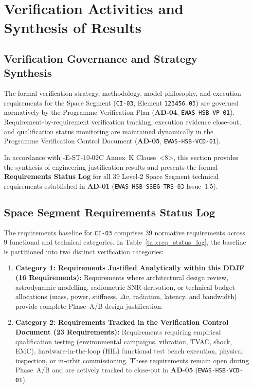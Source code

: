 \section{Verification Activities and Synthesis of Results}
\label{sec:verification}

\subsection{Verification Governance and Strategy Synthesis}
\label{sec:verification_governance}

The formal verification strategy, methodology, model philosophy, and execution requirements for the  Space Segment (\texttt{CI-03},  Element \texttt{123456.03}) are governed normatively by the Programme Verification Plan (\textbf{AD-04}, \texttt{EWAS-HSB-VP-01}). Requirement-by-requirement verification tracking, execution evidence close-out, and qualification status monitoring are maintained dynamically in the Programme Verification Control Document (\textbf{AD-05}, \texttt{EWAS-HSB-VCD-01}).

In accordance with -E-ST-10-02C Annex~K Clause~\textless8\textgreater, this section provides the synthesis of engineering justification results and presents the formal \textbf{Requirements Status Log} for all 39 Level-2 Space Segment technical requirements established in \textbf{AD-01} (\texttt{EWAS-HSB-SSEG-TRS-03} Issue~1.5).

\subsection{Space Segment Requirements Status Log}
\label{sec:req_status_log_section}

The requirements baseline for \texttt{CI-03} comprises 39 normative requirements across 9 functional and technical categories. In Table~\ref{tab:req_status_log}, the baseline is partitioned into two distinct verification categories:
\begin{enumerate}
    \item \textbf{Category 1: Requirements Justified Analytically within this DDJF (16 Requirements):} Requirements where architectural design review, astrodynamic modelling, radiometric SNR derivation, or technical budget allocations (mass, power, stiffness, $\Delta v$, radiation, latency, and bandwidth) provide complete Phase~A/B design justification.
    \item \textbf{Category 2: Requirements Tracked in the Verification Control Document (23 Requirements):} Requirements requiring empirical qualification testing (environmental campaigns, vibration, TVAC, shock, EMC), hardware-in-the-loop (HIL) functional test bench execution, physical inspection, or in-orbit commissioning. These requirements remain open during Phase~A/B and are actively tracked to close-out in \textbf{AD-05} (\texttt{EWAS-HSB-VCD-01}).
\end{enumerate}

